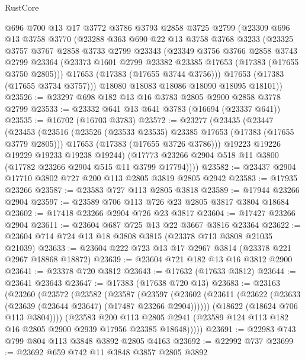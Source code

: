 \begin{lexlean}{RustCore}
\begin{coremodule}
    @696
    @700
    @13
    @17
    @3772
    @3786
    @3793
    @2858
    @3725
    @2799
    (@23309
      @696
      @13
      @3758
      @3770
      (@23288
        @363
        @690
        @22
        @13
        @3758
        @3768
        @3233
        (@23325
          @3757
          @3767
          @2858
          @3733
          @2799
          @23343
          (@23349
            @3756
            @3766
            @2858
            @3743
            @2799
            @23364
            (@23373 @1601 @2799 @23382 @23385 @17653 (@17383 (@17655 @3750 @2805)))
            @17653
            (@17383 (@17655 @3744 @3756)))
          @17653
          (@17383 (@17655 @3734 @3757)))
        @18080
        @18083
        @18086
        @18090
        @18095
        @18101))
@23526 := @23297 @698 @182 @13 @16 @3783 @2805 @2900 @2858 @3778 @2799
@23533 := @23332 @641 @13 @641 @3783 (@16694 (@23337 @641))
@23535 := @16702 (@16703 @3783)
@23572 := @23277
    (@23435
      (@23447
        (@23453
          (@23516
            (@23526 (@23533 @23535) @23385 @17653 (@17383 (@17655 @3779 @2805)))
            @17653
            (@17383 (@17655 @3726 @3786)))
          @19223
          @19226
          @19229
          @19233
          @19238
          @19244)
        (@17773 @23266 @2904 @518 @11 @3800 (@17782 @23266 @2904 @515 @11 @3799 @17794))))
@23582 := @23437 @2904 @17710 @3802 @727 @200 @113 @2805 @3819 @2805 @2942
@23583 := @17935 @23266
@23587 := @23583 @727 @113 @2805 @3818
@23589 := @17944 @23266 @2904
@23597 := @23589 @706 @113 @726 @23 @2805 @3817 @3804 @18684
@23602 := @17418 @23266 @2904 @726 @23 @3817
@23604 := @17427 @23266 @2904
@23611 := @23604 @687 @725 @13 @22 @3667 @3816 @23364
@23622 := @23604 @714 @724 @13 @18 @3808 @3815 (@23378 @713 @3808 @21035 @21039)
@23633 := @23604 @222 @723 @13 @17 @2967 @3814 (@23378 @221 @2967 @18868 @18872)
@23639 := @23604 @721 @182 @13 @16 @3812 @2900
@23641 := @23378 @720 @3812
@23643 := @17632 (@17633 @3812)
@23644 := @23641 @23643
@23647 := @17383 (@17638 @720 @13)
@23683 := @23163
    (@23260
      (@23572
        (@23582
          (@23587
            (@23597
              (@23602 (@23611 (@23622 (@23633 (@23639 (@23644 @23647) (@17487 @23266 @2904))))))
              (@18622 (@18624 @706 @113 @3804))))
          (@23583
            @200
            @113
            @2805
            @2941
            (@23589 @124 @113 @182 @16 @2805 @2900 @2939 @17956 @23385 @18648)))))
@23691 := @22983 @743 @799 @804 @113 @3848 @3892 @2805 @4163
@23692 := @22992 @737
@23699 := @23692 @659 @742 @11 @3848 @3857 @2805 @3892

\end{coremodule}
\end{lexlean}
